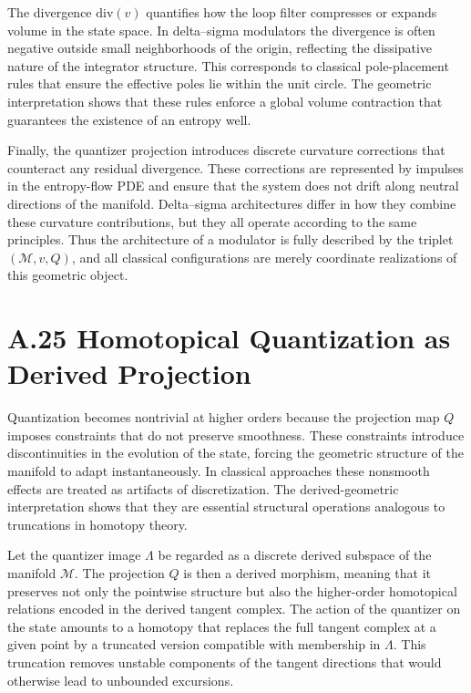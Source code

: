 The divergence \(\mathrm{div}(v)\) quantifies how the loop filter compresses or expands volume in the state space. In delta–sigma modulators the divergence is often negative outside small neighborhoods of the origin, reflecting the dissipative nature of the integrator structure. This corresponds to classical pole-placement rules that ensure the effective poles lie within the unit circle. The geometric interpretation shows that these rules enforce a global volume contraction that guarantees the existence of an entropy well.

Finally, the quantizer projection introduces discrete curvature corrections that counteract any residual divergence. These corrections are represented by impulses in the entropy-flow PDE and ensure that the system does not drift along neutral directions of the manifold. Delta–sigma architectures differ in how they combine these curvature contributions, but they all operate according to the same principles. Thus the architecture of a modulator is fully described by the triplet \((\mathcal{M},v,Q)\), and all classical configurations are merely coordinate realizations of this geometric object.

\section{A.25 Homotopical Quantization as Derived Projection}

Quantization becomes nontrivial at higher orders because the projection map \(Q\) imposes constraints that do not preserve smoothness. These constraints introduce discontinuities in the evolution of the state, forcing the geometric structure of the manifold to adapt instantaneously. In classical approaches these nonsmooth effects are treated as artifacts of discretization. The derived-geometric interpretation shows that they are essential structural operations analogous to truncations in homotopy theory.

Let the quantizer image \(\Lambda\) be regarded as a discrete derived subspace of the manifold \(\mathcal{M}\). The projection \(Q\) is then a derived morphism, meaning that it preserves not only the pointwise structure but also the higher-order homotopical relations encoded in the derived tangent complex. The action of the quantizer on the state amounts to a homotopy that replaces the full tangent complex at a given point by a truncated version compatible with membership in \(\Lambda\). This truncation removes unstable components of the tangent directions that would otherwise lead to unbounded excursions. 

